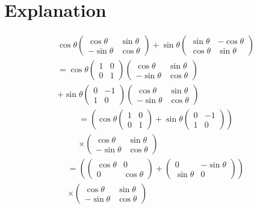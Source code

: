 \documentclass[journal,12pt,twocolumn]{IEEEtran}
\begin{document}
\section{\textbf{Explanation}}
\begin{gather}
    \cos\theta\left(\begin{array}{cc}\cos\theta & \sin\theta \\ -\sin\theta & \cos\theta\end{array}\right)+\sin\theta\left(\begin{array}{cc}\sin\theta & -\cos\theta \\ \cos\theta & \sin\theta\end{array}\right)\\
    =\cos\theta\left(\begin{array}{cc} 1 & 0 \\ 0 & 1\end{array}\right)\left(\begin{array}{cc}\cos\theta & \sin\theta \\ -\sin\theta & \cos\theta\end{array}\right)\\\nonumber+\sin\theta\left(\begin{array}{cc} 0 & -1 \\ 1 & 0 \end{array}\right)\left(\begin{array}{cc}\cos\theta & \sin\theta \\ -\sin\theta & \cos\theta\end{array}\right)
\end{gather}
\begin{multline}
    =\left(\cos\theta\left(\begin{array}{cc} 1 & 0 \\ 0 & 1\end{array}\right)+\sin\theta\left(\begin{array}{cc} 0 & -1 \\ 1 & 0 \end{array}\right)\right)\\\times\left(\begin{array}{cc}\cos\theta & \sin\theta \\ -\sin\theta & \cos\theta\end{array}\right)
\end{multline}
\begin{multline}
    =\left(\left(\begin{array}{cc} \cos\theta & 0 \\ 0 & \cos\theta\end{array}\right)+\left(\begin{array}{cc} 0 & -\sin\theta \\ \sin\theta & 0 \end{array}\right)\right)\\\times\left(\begin{array}{cc}\cos\theta & \sin\theta \\ -\sin\theta & \cos\theta\end{array}\right)
\end{multline}
\end{document}
